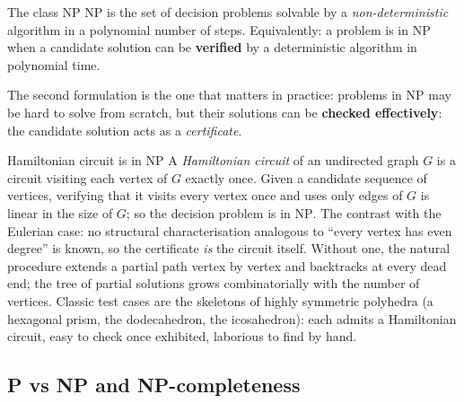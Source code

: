 \begin{definitionbox}{The class $\mathrm{NP}$}
$\mathrm{NP}$ is the set of decision problems solvable by a \emph{non-deterministic} algorithm in a polynomial number of steps. Equivalently: a problem is in $\mathrm{NP}$ when a candidate solution can be \textbf{verified} by a deterministic algorithm in polynomial time.
\end{definitionbox}
The second formulation is the one that matters in practice: problems in $\mathrm{NP}$ may be hard to solve from scratch, but their solutions can be \textbf{checked effectively}: the candidate solution acts as a \emph{certificate}.
\begin{examplebox}{Hamiltonian circuit is in $\mathrm{NP}$}
A \emph{Hamiltonian circuit} of an undirected graph $G$ is a circuit visiting each vertex of $G$ exactly once. Given a candidate sequence of vertices, verifying that it visits every vertex once and uses only edges of $G$ is linear in the size of $G$; so the decision problem is in $\mathrm{NP}$. The contrast with the Eulerian case: no structural characterisation analogous to ``every vertex has even degree'' is known, so the certificate \emph{is} the circuit itself. Without one, the natural procedure extends a partial path vertex by vertex and backtracks at every dead end; the tree of partial solutions grows combinatorially with the number of vertices. Classic test cases are the skeletons of highly symmetric polyhedra (a hexagonal prism, the dodecahedron, the icosahedron): each admits a Hamiltonian circuit, easy to check once exhibited, laborious to find by hand.
\end{examplebox}

\subsection{P vs NP and NP-completeness}

